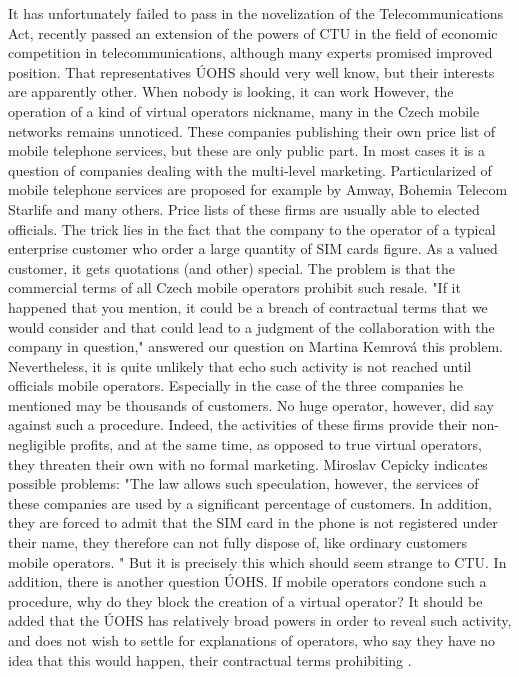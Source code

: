 It has unfortunately failed to pass in the novelization of the Telecommunications Act, recently passed an extension of the powers of CTU in the field of economic competition in telecommunications, although many experts promised improved position.
That representatives ÚOHS should very well know, but their interests are apparently other.
When nobody is looking, it can work
However, the operation of a kind of virtual operators nickname, many in the Czech mobile networks remains unnoticed.
These companies publishing their own price list of mobile telephone services, but these are only public part.
In most cases it is a question of companies dealing with the multi-level marketing.
Particularized of mobile telephone services are proposed for example by Amway, Bohemia Telecom Starlife and many others.
Price lists of these firms are usually able to elected officials.
The trick lies in the fact that the company to the operator of a typical enterprise customer who order a large quantity of SIM cards figure.
As a valued customer, it gets quotations (and other) special.
The problem is that the commercial terms of all Czech mobile operators prohibit such resale.
"If it happened that you mention, it could be a breach of contractual terms that we would consider and that could lead to a judgment of the collaboration with the company in question," answered our question on Martina Kemrová this problem.
Nevertheless, it is quite unlikely that echo such activity is not reached until officials mobile operators.
Especially in the case of the three companies he mentioned may be thousands of customers.
No huge operator, however, did say against such a procedure.
Indeed, the activities of these firms provide their non-negligible profits, and at the same time, as opposed to true virtual operators, they threaten their own with no formal marketing.
Miroslav Cepicky indicates possible problems: "The law allows such speculation, however, the services of these companies are used by a significant percentage of customers.
In addition, they are forced to admit that the SIM card in the phone is not registered under their name, they therefore can not fully dispose of, like ordinary customers mobile operators. "
But it is precisely this which should seem strange to CTU.
In addition, there is another question ÚOHS.
If mobile operators condone such a procedure, why do they block the creation of a virtual operator?
It should be added that the ÚOHS has relatively broad powers in order to reveal such activity, and does not wish to settle for explanations of operators, who say they have no idea that this would happen, their contractual terms prohibiting .
